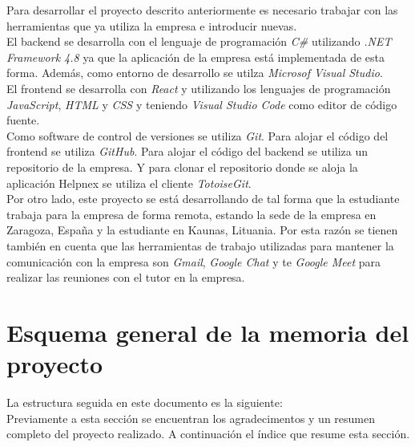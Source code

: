 
Para desarrollar el proyecto descrito anteriormente es necesario trabajar con las herramientas que ya utiliza la empresa e introducir nuevas.\\

El backend se desarrolla con el lenguaje de programación \textit{C\#} utilizando \textit{.NET Framework 4.8} ya que la aplicación de la empresa está implementada de esta forma. Además, como entorno de desarrollo se utilza \textit{Microsof Visual Studio}.\\

El frontend se desarrolla con \textit{React} y utilizando los lenguajes de programación \textit{JavaScript}, \textit{HTML} y \textit{CSS} y teniendo \textit{Visual Studio Code} como editor de código fuente.\\

Como software de control de versiones se utiliza \textit{Git}. Para alojar el código del frontend se utiliza \textit{GitHub}. Para alojar el código del backend se utiliza un repositorio de la empresa. Y para clonar el repositorio donde se aloja la aplicación Helpnex se utiliza el cliente \textit{TotoiseGit}.\\

Por otro lado, este proyecto se está desarrollando de tal forma que la estudiante trabaja para la empresa de forma remota, estando la sede de la empresa en Zaragoza, España y la estudiante en Kaunas, Lituania. Por esta razón se tienen también en cuenta que las herramientas de trabajo utilizadas para mantener la comunicación con la empresa son \textit{Gmail}, \textit{Google Chat} y te \textit{Google Meet} para realizar las reuniones con el tutor en la empresa.

\section{Esquema general de la memoria del proyecto}


La estructura seguida en este documento es la siguiente:\\

Previamente a esta sección se encuentran los agradecimentos y un resumen completo del proyecto realizado. A continuación el índice que resume esta sección.\\

